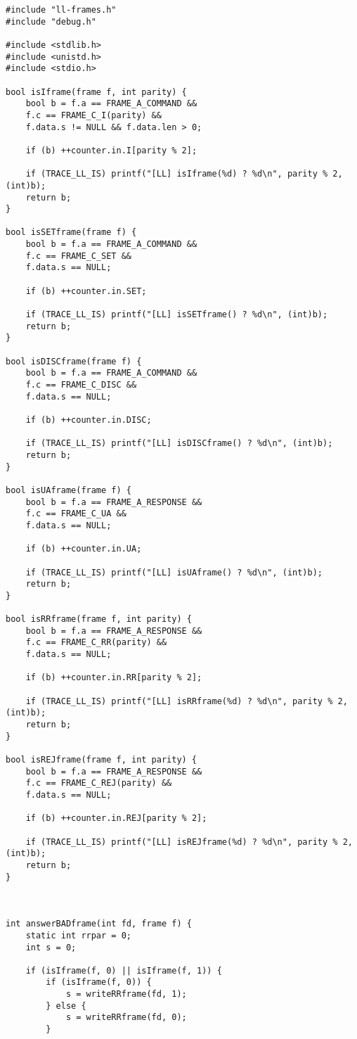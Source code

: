 \documentclass[subfiles]{main.tex}
\begin{document}
\begin{lstlisting}[style=rcom]
#include "ll-frames.h"
#include "debug.h"

#include <stdlib.h>
#include <unistd.h>
#include <stdio.h>

bool isIframe(frame f, int parity) {
	bool b = f.a == FRAME_A_COMMAND &&
	f.c == FRAME_C_I(parity) &&
	f.data.s != NULL && f.data.len > 0;
	
	if (b) ++counter.in.I[parity % 2];
	
	if (TRACE_LL_IS) printf("[LL] isIframe(%d) ? %d\n", parity % 2, (int)b);
	return b;
}

bool isSETframe(frame f) {
	bool b = f.a == FRAME_A_COMMAND &&
	f.c == FRAME_C_SET &&
	f.data.s == NULL;
	
	if (b) ++counter.in.SET;
	
	if (TRACE_LL_IS) printf("[LL] isSETframe() ? %d\n", (int)b);
	return b;
}

bool isDISCframe(frame f) {
	bool b = f.a == FRAME_A_COMMAND &&
	f.c == FRAME_C_DISC &&
	f.data.s == NULL;
	
	if (b) ++counter.in.DISC;
	
	if (TRACE_LL_IS) printf("[LL] isDISCframe() ? %d\n", (int)b);
	return b;
}

bool isUAframe(frame f) {
	bool b = f.a == FRAME_A_RESPONSE &&
	f.c == FRAME_C_UA &&
	f.data.s == NULL;
	
	if (b) ++counter.in.UA;
	
	if (TRACE_LL_IS) printf("[LL] isUAframe() ? %d\n", (int)b);
	return b;
}

bool isRRframe(frame f, int parity) {
	bool b = f.a == FRAME_A_RESPONSE &&
	f.c == FRAME_C_RR(parity) &&
	f.data.s == NULL;
	
	if (b) ++counter.in.RR[parity % 2];
	
	if (TRACE_LL_IS) printf("[LL] isRRframe(%d) ? %d\n", parity % 2, (int)b);
	return b;
}

bool isREJframe(frame f, int parity) {
	bool b = f.a == FRAME_A_RESPONSE &&
	f.c == FRAME_C_REJ(parity) &&
	f.data.s == NULL;
	
	if (b) ++counter.in.REJ[parity % 2];
	
	if (TRACE_LL_IS) printf("[LL] isREJframe(%d) ? %d\n", parity % 2, (int)b);
	return b;
}



int answerBADframe(int fd, frame f) {
	static int rrpar = 0;
	int s = 0;
	
	if (isIframe(f, 0) || isIframe(f, 1)) {
		if (isIframe(f, 0)) {
			s = writeRRframe(fd, 1);
		} else {
			s = writeRRframe(fd, 0);
		}
		

\end{lstlisting}
\end{document}

